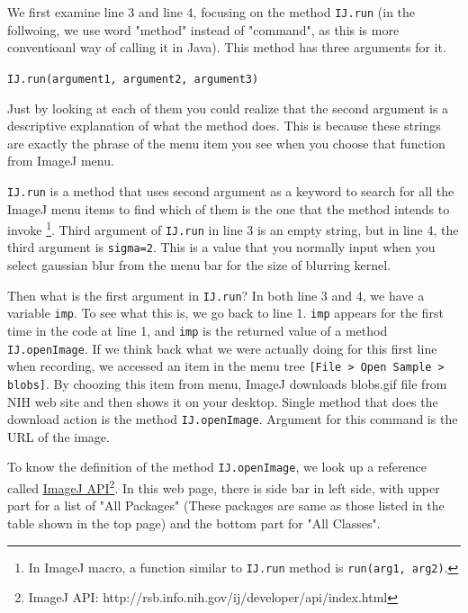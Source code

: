 \documentclass[11pt,a4paper,oneside]{report}
\newcommand{\ijmenu}[1]{\texttt{\small#1}}
\newcommand{\ilcom}[1]{\texttt{\small#1}}
\begin{document}
%


We first examine line 3 and line 4, focusing on the method \ilcom{IJ.run}  (in the follwoing, we use word "method" instead of "command", as this is more conventioanl way of calling it in Java). This method has three arguments for it.

\ilcom{IJ.run(argument1, argument2, argument3)}

 Just by looking at each of them you could realize that the second argument is a descriptive explanation of what the method does. This is because these strings are exactly the phrase of the menu item you see when you choose that function from ImageJ menu. 

\ilcom{IJ.run} is a method that uses second argument as a keyword to search for all the ImageJ menu items to find which of them is the one that the method intends to invoke \footnote{In ImageJ macro, a function similar to \ilcom{IJ.run} method is \ilcom{run(arg1, arg2)}.}. Third argument of \ilcom{IJ.run} in line 3 is an empty string, but in line 4, the third argument is \ilcom{sigma=2}. This is a value that you normally input when you select gaussian blur from the menu bar for the size of blurring kernel. 

Then what is the first argument in \ilcom{IJ.run}? In both line 3 and 4, we have a variable \ilcom{imp}. To see what this is, we go back to line 1. \ilcom{imp} appears for the first time in the code at line 1, and \ilcom{imp} is the returned value of a method \ilcom{IJ.openImage}. If we think back what we were actually doing for this first line when recording, we accessed an item in the menu tree \ijmenu{[File > Open Sample > blobs]}. By choozing this item from menu, ImageJ downloads blobs.gif file from NIH web site and then shows it on your desktop. Single method that does the download action is the method \ilcom{IJ.openImage}. Argument for this command is the URL of the image. 

To know the definition of the method \ilcom{IJ.openImage}, we look up a reference called \href{http://rsb.info.nih.gov/ij/developer/api/index.html}{ImageJ API}\footnote{ ImageJ API: http://rsb.info.nih.gov/ij/developer/api/index.html}. In this web page, there is side bar in left side, with upper part for a list of "All Packages" (These packages are same as those listed in the table shown in the top page) and the bottom part for "All Classes".  
\end{document}
